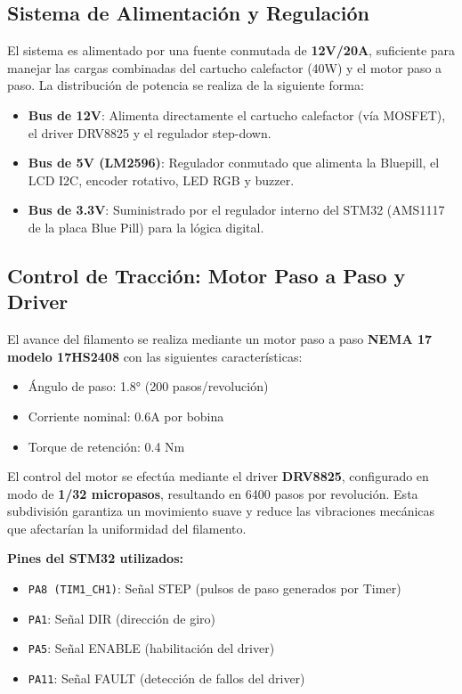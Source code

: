 \documentclass[12pt]{article}
\begin{document}
\subsection{Sistema de Alimentación y Regulación}
El sistema es alimentado por una fuente conmutada de \textbf{12V/20A}, suficiente para manejar las cargas combinadas del cartucho calefactor (40W) y el motor paso a paso. La distribución de potencia se realiza de la siguiente forma:
\begin{itemize}
    \item \textbf{Bus de 12V}: Alimenta directamente el cartucho calefactor (vía MOSFET), el driver DRV8825 y el regulador step-down.
    \item \textbf{Bus de 5V (LM2596)}: Regulador conmutado que alimenta la Bluepill, el LCD I2C, encoder rotativo, LED RGB y buzzer.
    \item \textbf{Bus de 3.3V}: Suministrado por el regulador interno del STM32 (AMS1117 de la placa Blue Pill) para la lógica digital.
\end{itemize}

\subsection{Control de Tracción: Motor Paso a Paso y Driver}
El avance del filamento se realiza mediante un motor paso a paso \textbf{NEMA 17 modelo 17HS2408} con las siguientes características:
\begin{itemize}
    \item Ángulo de paso: 1.8° (200 pasos/revolución)
    \item Corriente nominal: 0.6A por bobina
    \item Torque de retención: 0.4 Nm
\end{itemize}

El control del motor se efectúa mediante el driver \textbf{DRV8825}, configurado en modo de \textbf{1/32 micropasos}, resultando en 6400 pasos por revolución. Esta subdivisión garantiza un movimiento suave y reduce las vibraciones mecánicas que afectarían la uniformidad del filamento.

\textbf{Pines del STM32 utilizados:}
\begin{itemize}
    \item \texttt{PA8 (TIM1\_CH1)}: Señal STEP (pulsos de paso generados por Timer)
    \item \texttt{PA1}: Señal DIR (dirección de giro)
    \item \texttt{PA5}: Señal ENABLE (habilitación del driver)
    \item \texttt{PA11}: Señal FAULT (detección de fallos del driver)
\end{itemize}
\end{document}
